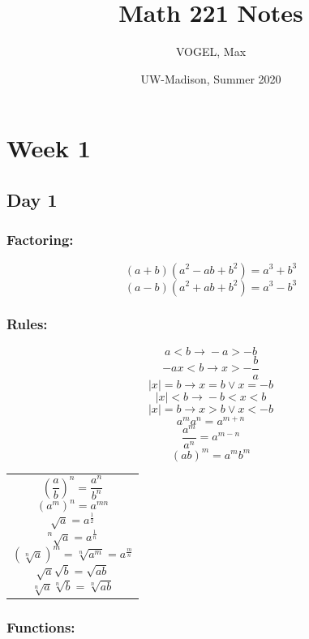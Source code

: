 \documentclass[12pt]{article}
\begin{document}
 
\title{Math 221 Notes}
\author{VOGEL, Max}
\date{UW-Madison, Summer 2020}

\setcounter{tocdepth}{4}
\setcounter{secnumdepth}{4}

\maketitle
\tableofcontents
\newpage

\section{Week 1}
\subsection{Day 1}
\subsubsection{Factoring:}
$$(a+b)(a^2-ab+b^2)=a^3+b^3 $$
$$(a-b)(a^2+ab+b^2)=a^3-b^3 $$


\subsubsection{Rules:}
\begin{minipage}{0.45\textwidth}
$$ a < b \rightarrow{} -a > -b $$
$$ -ax < b \rightarrow{} x > -\frac{b}{a} $$
$$ |x| = b \rightarrow{} x = b \vee x = -b $$
$$ |x| < b \rightarrow{} -b < x < b $$
$$ |x| = b \rightarrow{} x > b \vee x < -b $$
$$ a^m a^n = a^{m+n} $$
$$ \frac{a^m}{a^n} = a^{m-n}$$
$$ (ab)^m=a^m b^m$$
\hfill
\end{minipage}
\begin{minipage}{0.45\textwidth}
\begin{tabular}{|p{\textwidth}}
$$ \left(\frac{a}{b}\right)^n = \frac{a^n}{b^n}$$
$$ (a^m)^n = a^{mn}$$
$$ \sqrt{a} = a^{\frac{1}{2}}$$
$$ ^n\sqrt{a} = a^{\frac{1}{n}}$$
$$ \left(\sqrt[n]{a}\right)^m = \sqrt[n]{a^m} = a^{\frac{m}{n}}$$
$$ \sqrt{a}\sqrt{b} = \sqrt{ab}$$
$$ \sqrt[n]{a} \sqrt[n]{b} = \sqrt[n]{ab}$$\\
\end{tabular}
\end{minipage}

\subsubsection{Functions:}
\end{document}
